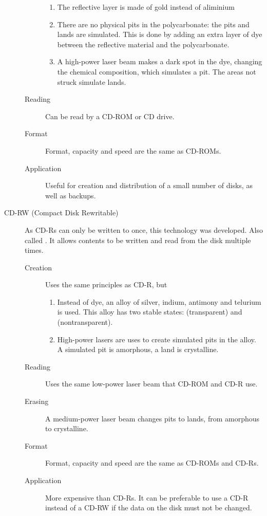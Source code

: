 \documentclass[../notes.tex]{subfiles}
\begin{document}
\begin{indentparagraph}
\begin{description}
\begin{description}
\begin{enumerate}[label=\alph*, nosep]
											\item The reflective layer is made of gold instead of aliminium
											\item There are no physical pits in the polycarbonate: the pits and lands are simulated. This is done by adding an extra layer of dye between the reflective material and the polycarbonate.
											\item A high-power laser beam makes a dark spot in the dye, changing the chemical composition, which simulates a pit. The areas not struck simulate lands.
										\end{enumerate} 
									\item[Reading] Can be read by a CD-ROM or CD drive.
									\item[Format] Format, capacity and speed are the same as CD-ROMs.
									\item[Application] Useful for creation and distribution of a small number of disks, as well as backups.
								\end{description}
							\item[CD-RW (Compact Disk Rewritable)] As CD-Rs can only be written to once, this technology was developed. Also called . It allows contents to be written and read from the disk multiple times.
								\begin{description}
									\item[Creation] Uses the same principles as CD-R, but
										\begin{enumerate}[label=\alph*, nosep]
											\item Instead of dye, an alloy of silver, indium, antimony and telurium is used. This alloy has two stable states:  (transparent) and  (nontransparent).
											\item High-power lasers are uses to create simulated pits in the alloy. A simulated pit is amorphous, a land is crystalline.
										\end{enumerate}
									\item[Reading] Uses the same low-power laser beam that CD-ROM and CD-R use.
									\item[Erasing] A medium-power laser beam changes pits to lands, from amorphous to crystalline.
									\item[Format] Format, capacity and speed are the same as CD-ROMs and CD-Rs.
									\item[Application] More expensive than CD-Rs. It can be preferable to use a CD-R instead of a CD-RW if the data on the disk must not be changed.

\end{description}
\end{description}
\end{indentparagraph}
\end{document}
